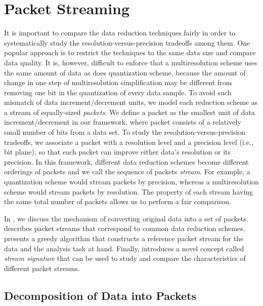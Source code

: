 \section{Packet Streaming} \label{sec:terminologies}

It is important to compare the data reduction techniques fairly in order to systematically study the
resolution-versus-precision tradeoffs among them. One popular approach is to restrict the techniques
to the same data size and compare data quality. It is, however, difficult to enforce that a
multiresolution scheme uses the same amount of data as does quantization scheme, because the amount
of change in one step of multiresolution simplification may be different from removing one bit in
the quantization of every data sample. To avoid such mismatch of data increment/decrement units, we
model each reduction scheme as a stream of equally-sized \emph{packets}. We define a packet as the
smallest unit of data increment/decrement in our framework, where packet consists of a relatively
small number of bits from a data set. To study the resolution-versus-precision tradeoffs, we
associate a packet with a resolution level and a precision level (i.e., bit plane), so that each
packet can improve either data's resolution or its precision. In this framework, different data
reduction schemes become different orderings of packets and we call the sequence of packets
\emph{stream}. For example, a quantization scheme would stream packets by precision, whereas a
multiresolution scheme would stream packets by resolution. The property of each stream having the
same total number of packets allows us to perform a fair comparison.

In , we discuss the mechanism of converting original data into a
set of packets.  describes packet streams that correspond to common
data reduction schemes.  presents a greedy algorithm that constructs a
reference packet stream for the data and the analysis task at hand. Finally,
 introduces a novel concept called \emph{stream signature} that can be
used to study and compare the characteristics of different packet streams.

\subsection{Decomposition of Data into Packets} \label{sec:data-streaming-framework}

